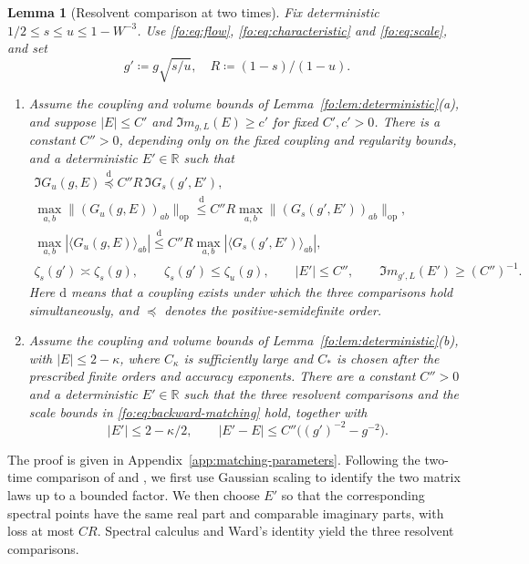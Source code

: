 \documentclass[11pt]{article}
\numberwithin{equation}{section}
\newtheorem{lemma}[theorem]{Lemma}
\theoremstyle{remark}
\newcommand{\R}{\mathbb R}
\newcommand{\op}{\mathrm{op}}
\begin{document}
\begin{lemma}[Resolvent comparison at two times]\label{fo:lem:families}
Fix deterministic $1/2\le s\le u\le1-W^{-3}$. Use \eqref{fo:eq:flow},
\eqref{fo:eq:characteristic} and \eqref{fo:eq:scale}, and set
$$g'\coloneqq g\sqrt{s/u},\quad R\coloneqq(1-s)/(1-u).$$
\begin{enumerate}
\item[(a)] Assume the coupling and volume bounds of
Lemma~\ref{fo:lem:deterministic}(a), and suppose
$|E|\le C'$ and $\Im m_{g,L}(E)\ge c'$ for fixed $C',c'>0$.
There is a constant $C''>0$, depending only on the fixed coupling and
regularity bounds, and a deterministic $E'\in\R$ such that
\begin{equation}\label{fo:eq:backward-matching}
 \begin{gathered}
 \Im G_u(g,E)\overset{\mathrm d}{\preceq} C''R\,\Im G_s(g',E'),\\
 \max_{a,b}\|(G_u(g,E))_{ab}\|_{\op}
 \overset{\mathrm d}{\le} C''R\max_{a,b}\|(G_s(g',E'))_{ab}\|_{\op},\\
 \max_{a,b}|\langle G_u(g,E)\rangle_{ab}|
 \overset{\mathrm d}{\le} C''R\max_{a,b}|\langle G_s(g',E')\rangle_{ab}|,\\
 \zeta_s(g')\asymp\zeta_s(g),\qquad
 \zeta_s(g')\le\zeta_u(g), \qquad
 |E'|\le C'',\qquad \Im m_{g',L}(E')\ge(C'')^{-1}.
 \end{gathered}
\end{equation}
Here $\mathrm d$ means that a coupling exists under which the three
comparisons hold simultaneously, and $\preceq$ denotes the
positive-semidefinite order.

\item[(b)] Assume the coupling and volume bounds of
Lemma~\ref{fo:lem:deterministic}(b), with $|E|\le2-\kappa$,
where $C_\kappa$ is sufficiently large and $C_*$ is chosen after the
prescribed finite orders and accuracy exponents.
There are a constant $C''>0$ and a deterministic $E'\in\R$
such that the three resolvent comparisons and the scale bounds in
\eqref{fo:eq:backward-matching} hold, together with
\begin{equation}\label{fo:eq:large-backward-domain}
 |E'|\le2-\kappa/2,\qquad
 |E'-E|\le C''\bigl((g')^{-2}-g^{-2}\bigr).
\end{equation}
\end{enumerate}
\end{lemma}
The proof is given in Appendix~\ref{app:matching-parameters}.
Following the two-time comparison of \cite[Lemma~2.8]{YY} and
\cite[Lemma~3.3]{TYY}, we first use Gaussian scaling to identify the two
matrix laws up to a bounded factor. We then choose $E'$ so that the corresponding spectral points
have the same real part and comparable imaginary parts, with loss at most
$CR$. Spectral calculus and Ward's identity yield the three resolvent
comparisons.
\end{document}
